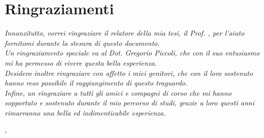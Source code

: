 
\cleardoublepage
{}
{}




\begingroup
\let\clearpage\relax
\let\cleardoublepage\relax
\let\cleardoublepage\relax

\chapter*{Ringraziamenti}

\noindent \textit{Innanzitutto, vorrei ringraziare il relatore della mia tesi, il Prof. \myProf, per l'aiuto fornitomi durante la stesura di questo documento.}\\

\noindent \textit{Un ringraziamento speciale va al Dot. Gregorio Piccoli, che con il suo entusiasmo mi ha permesso di vivere questa bella esperienza.}\\

\noindent \textit{Desidero inoltre ringraziare con affetto i miei genitori, che con il loro sostenuto hanno reso possibile il raggiungimento di questo traguardo.}\\

\noindent \textit{Infine, un ringraziare a tutti gli amici e compagni di corso che mi hanno sopportato e sostenuto durante il mio percorso di studi, grazie a loro questi anni rimarranno una bella ed indimenticabile esperienza.}\\

\bigskip

\noindent\textit{\myLocation, \myTime}
\hfill \myName

\endgroup

